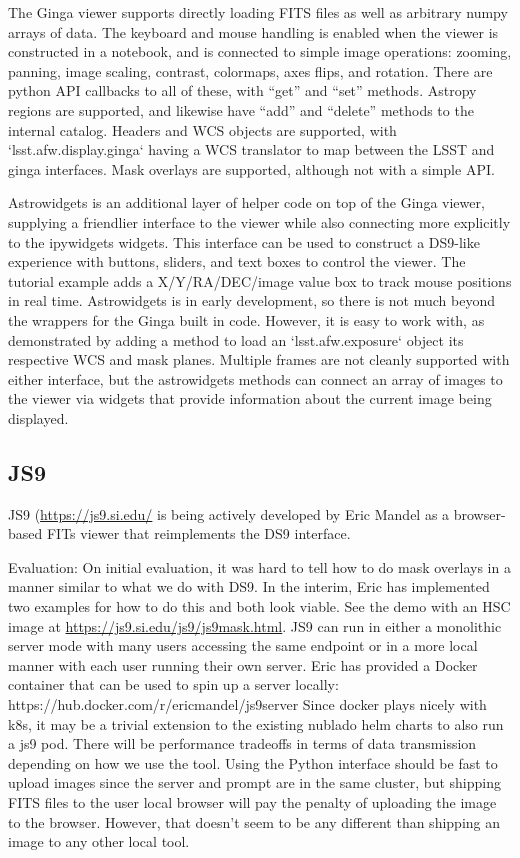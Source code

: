 The Ginga viewer supports directly loading FITS files as well as arbitrary numpy arrays of data.  The keyboard and mouse handling is enabled when the viewer is constructed in a notebook, and is connected to simple image operations: zooming, panning, image scaling, contrast, colormaps, axes flips, and rotation.  There are python API callbacks to all of these, with ``get'' and ``set'' methods.  Astropy regions are supported, and likewise have ``add'' and ``delete'' methods to the internal catalog.  Headers and WCS objects are supported, with `lsst.afw.display.ginga` having a WCS translator to map between the LSST and ginga interfaces.  Mask overlays are supported, although not with a simple API.

Astrowidgets is an additional layer of helper code on top of the Ginga viewer, supplying a friendlier interface to the viewer while also connecting more explicitly to the ipywidgets widgets.  This interface can be used to construct a DS9-like experience with buttons, sliders, and text boxes to control the viewer.  The tutorial example adds a X/Y/RA/DEC/image value box to track mouse positions in real time.  Astrowidgets is in early development, so there is not much beyond the wrappers for the Ginga built in code.  However, it is easy to work with, as demonstrated by adding a method to load an `lsst.afw.exposure` object its respective WCS and mask planes.  Multiple frames are not cleanly supported with either interface, but the astrowidgets methods can connect an array of images to the viewer via widgets that provide information about the current image being displayed.

\subsection{JS9}

JS9 (\url{https://js9.si.edu/} is being actively developed by Eric Mandel as a browser-based FITs viewer that reimplements the DS9 interface.

Evaluation:
On initial evaluation, it was hard to tell how to do mask overlays in a manner similar to what we do with DS9.
In the interim, Eric has implemented two examples for how to do this and both look viable.
See the demo with an HSC image at \url{https://js9.si.edu/js9/js9mask.html}.
JS9 can run in either a monolithic server mode with many users accessing the same endpoint or in a more local manner with each user running their own server.
Eric has provided a Docker container that can be used to spin up a server locally: https://hub.docker.com/r/ericmandel/js9server
Since docker plays nicely with k8s, it may be a trivial extension to the existing nublado helm charts to also run a js9 pod.
There will be performance tradeoffs in terms of data transmission depending on how we use the tool.
Using the Python interface should be fast to upload images since the server and prompt are in the same cluster, but shipping FITS files to the user local browser will pay the penalty of uploading the image to the browser.
However, that doesn't seem to be any different than shipping an image to any other local tool.


